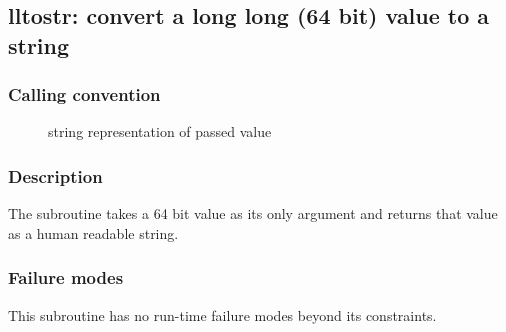 \clearpage
{}
{}
\label{subr:lltostr}
\subsection*{lltostr: convert a long long (64 bit) value to a string}

\subsubsection*{Calling convention}

\begin{description}
\item[] string representation of passed value
\end{description}

\subsubsection*{Description}

The  subroutine takes a 64 bit value as its only
argument and returns that value as a human readable string.

\subsubsection*{Failure modes}

This subroutine has no run-time failure modes beyond its constraints.
